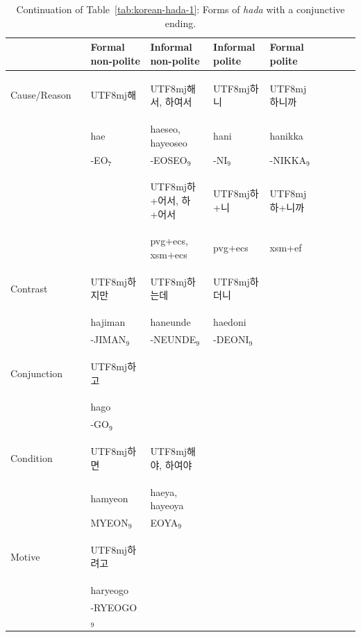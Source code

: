 \documentclass[11pt,letterpaper]{article}
\newcommand{\korean}[1]{\begin{CJK}{UTF8}{mj}#1\end{CJK}}
\begin{document}
\begin{table}
\begin{tabular}{llllllllll}
           &          &Formal non-polite & Informal non-polite & Informal polite & Formal polite \\ \hline \hline
Cause/Reason && \korean{해} & \korean{해서, 하여서} & \korean{하니} & \korean{하니까} \\
&& hae & haeseo, hayeoseo & hani & hanikka \\ 
&& -EO$_7$ & -EOSEO$_9$ & -NI$_9$ & -NIKKA$_9$ \\
&& &\korean{하+어서, 하+어서} & \korean{하+니} & \korean{하+니까} \\
&& & pvg+ecs, xsm+ecs         & pvg+ecs & xsm+ef \\
\hline
Contrast && \korean{하지만} & \korean{하는데} & \korean{하더니} \\
 && hajiman & haneunde & haedoni & \\ 
 && -JIMAN$_9$ & -NEUNDE$_9$ & -DEONI$_9$ & \\ \hline
Conjunction && \korean{하고} \\
 && hago \\ 
&& -GO$_9$ \\ \hline
Condition && \korean{하면} & \korean{해야, 하여야} \\
&& hamyeon & haeya, hayeoya \\
&& MYEON$_9$ & EOYA$_9$ \\ \hline
Motive && \korean{하려고} \\
 && haryeogo \\
&& -RYEOGO$_9$
\end{tabular}
	\caption{Continuation of Table~\ref{tab:korean-hada-1}: Forms of \textit{hada} with a conjunctive ending.}\label{tab:korean-hada-2}
\end{table}
\end{document}

